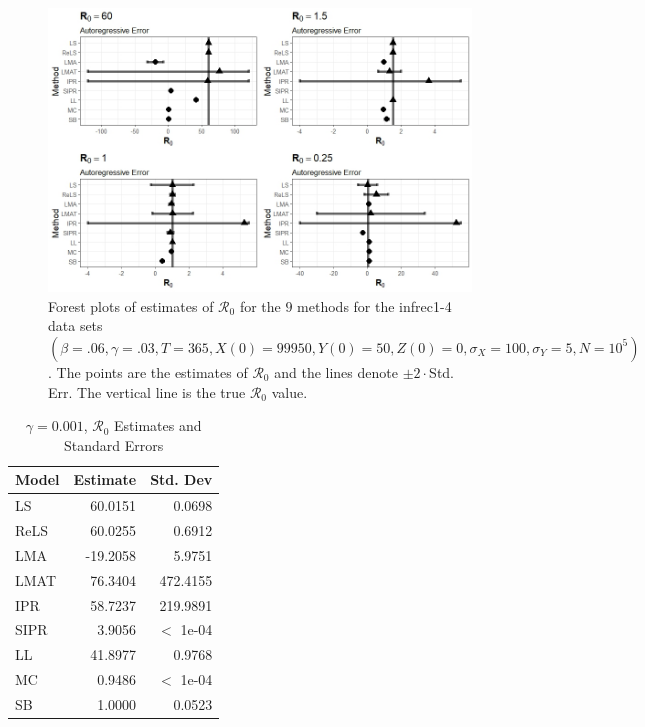 \documentclass[12pt]{article}
\newcommand{\xxsir}{\ensuremath{9} } %
\newcommand{\rr}{\ensuremath{\mathcal{R}_0}}
\begin{document}
\begin{figure}[H]
	\centering
	\includegraphics[scale=0.5]{images/parchange_ar.jpeg}
	\caption{Forest plots of estimates of $\rr$ for the \xxsir methods for the infrec1-4 data sets $(\beta=.06, \gamma=.03, T=365, X(0)=99950, Y(0)=50, Z(0)=0, \sigma_X=100, \sigma_Y=5, N=10^5)$.  The points are the estimates of $\rr$ and the lines denote $\pm 2\cdot $Std. Err.  The vertical line is the true $\rr$ value.}
\end{figure}
\begin{table}[H]
	
	\centering
	\begin{tabular}[t]{l|r|r}
		\hline
		Model & Estimate & Std. Dev\\
		\hline
		LS & 60.0151 & 0.0698\\
		\hline
		ReLS & 60.0255 & 0.6912\\
		\hline
		LMA & -19.2058 & 5.9751\\
		\hline
		LMAT & 76.3404 & 472.4155\\
		\hline
		IPR & 58.7237 & 219.9891\\
		\hline
		SIPR & 3.9056 & $<$ 1e-04\\
		\hline
		LL & 41.8977 & 0.9768\\
		\hline
		MC & 0.9486 & $<$ 1e-04\\
		\hline
		SB & 1.0000 & 0.0523\\
		\hline
	\end{tabular}
	\caption{$\gamma = 0.001$, $\rr$ Estimates and Standard Errors}
\end{table}
\end{document}
